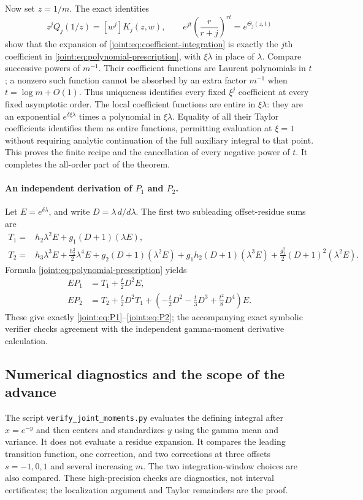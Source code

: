 \documentclass[11pt,a4paper]{article}
\numberwithin{equation}{section}
\theoremstyle{plain}
\theoremstyle{definition}
\theoremstyle{remark}
\begin{document}
Now set $z=1/m$. The exact identities
\[
 z^jQ_j(1/z)=[w^j]K_j(z,w),\qquad
 e^{jt}\left(\frac r{r+j}\right)^{rt}=e^{\Theta_j(z,t)}
\]
show that the expansion of \eqref{joint:eq:coefficient-integration}
is exactly the $j$th coefficient in
\eqref{joint:eq:polynomial-prescription}, with $\xi\lambda$ in place
of $\lambda$. Compare successive powers of $m^{-1}$.
Their coefficient functions are Laurent polynomials in $t$;
a nonzero such function cannot be absorbed by an extra factor
$m^{-1}$ when $t=\log m+O(1)$. Thus uniqueness identifies every
fixed $\xi^j$ coefficient at every fixed asymptotic order.
The local coefficient functions are entire in $\xi\lambda$:
they are an exponential $e^{\delta\xi\lambda}$ times a polynomial
in $\xi\lambda$. Equality of all their Taylor coefficients identifies
them as entire functions, permitting evaluation at $\xi=1$ without
requiring analytic continuation of the full auxiliary integral to
that point. This proves the finite recipe and the cancellation of
every negative power of $t$.
It completes the all-order part of the theorem.

\paragraph{An independent derivation of $P_1$ and $P_2$.}
Let $E=e^{\delta\lambda}$, and write $D=\lambda\,d/d\lambda$.
The first two subleading offset-residue sums are
\begin{align*}
 T_1={}&h_2\lambda^2E+g_1(D+1)(\lambda E),\\
 T_2={}&h_3\lambda^3E+\frac{h_2^2}{2}\lambda^4E
   +g_2(D+1)(\lambda^2E)
   +g_1h_2(D+1)(\lambda^3E)
   +\frac{g_1^2}{2}(D+1)^2(\lambda^2E).
\end{align*}
Formula \eqref{joint:eq:polynomial-prescription} yields
\begin{align*}
 EP_1&=T_1+\frac t2D^2E,\\
 EP_2&=T_2+\frac t2D^2T_1
       +\left(-\frac t2D^2-\frac t3D^3+\frac{t^2}{8}D^4\right)E.
\end{align*}
These give exactly \eqref{joint:eq:P1}--\eqref{joint:eq:P2}; the
accompanying exact symbolic verifier checks agreement with the
independent gamma-moment derivative calculation.

\subsection{Numerical diagnostics and the scope of the advance}

The script \texttt{verify\_joint\_moments.py} evaluates the defining
integral after $x=e^{-y}$ and then centers and standardizes $y$ using
the gamma mean and variance. It does not evaluate a residue expansion.
It compares the leading transition function, one correction, and two
corrections at three offsets $s=-1,0,1$ and several increasing $m$.
The two integration-window choices are also compared.
These high-precision checks are diagnostics, not interval certificates;
the localization argument and Taylor remainders are the proof.
\end{document}
